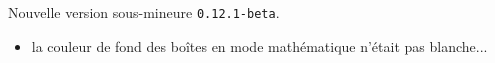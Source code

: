 Nouvelle version sous-mineure \verb+0.12.1-beta+.

\begin{itemize}[itemsep=.5em]
    \item {}
          la couleur de fond des boîtes en mode mathématique n'était pas blanche...
\end{itemize}


\separation
